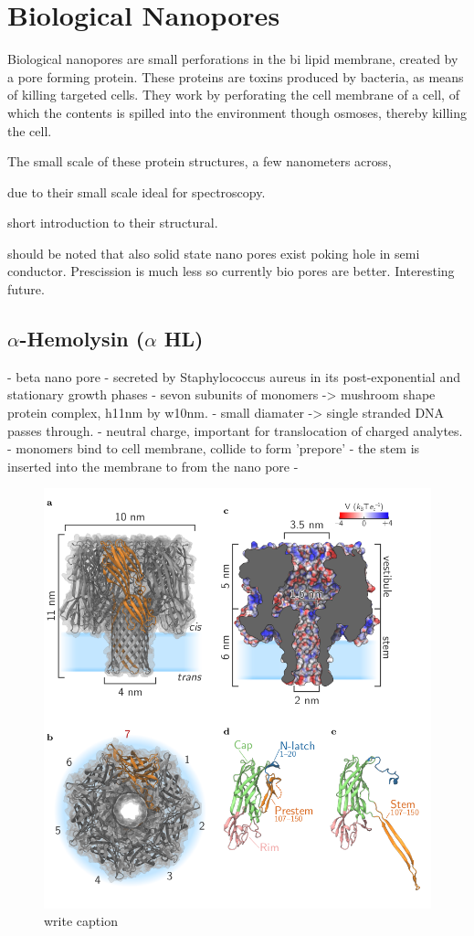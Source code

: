 \section{Biological Nanopores}

Biological nanopores are small perforations in the bi lipid membrane, created by a pore
forming protein.  These proteins are toxins
produced by bacteria, as means of killing targeted cells. They work by perforating
the cell membrane of a cell, of which the contents is spilled into the
environment though osmoses, thereby killing the cell.

The small scale of these protein structures, a few nanometers across,


due to their small scale ideal for spectroscopy.

short introduction to their structural.

should be noted that also solid state nano pores exist poking hole in semi conductor.
Prescission is much less so currently bio pores are better. Interesting future.


\subsection{$\alpha$-Hemolysin ($\alpha$ HL)}


- beta nano pore
- secreted by Staphylococcus aureus in its post-exponential and stationary growth phases
- sevon subunits of monomers ->  mushroom shape protein complex, h11nm by w10nm.
- small diamater -> single stranded DNA passes through.
- neutral charge, important for translocation of charged analytes.
- monomers bind to cell membrane, collide to form 'prepore'
- the stem is inserted into the membrane to from the nano pore
-


\begin{figure}[h!]
  \centering
  \includegraphics[width=0.5\linewidth]{Figures/alpha-hemolysin.png}
  \caption{write caption}
  \label{adsf}
\end{figure}



